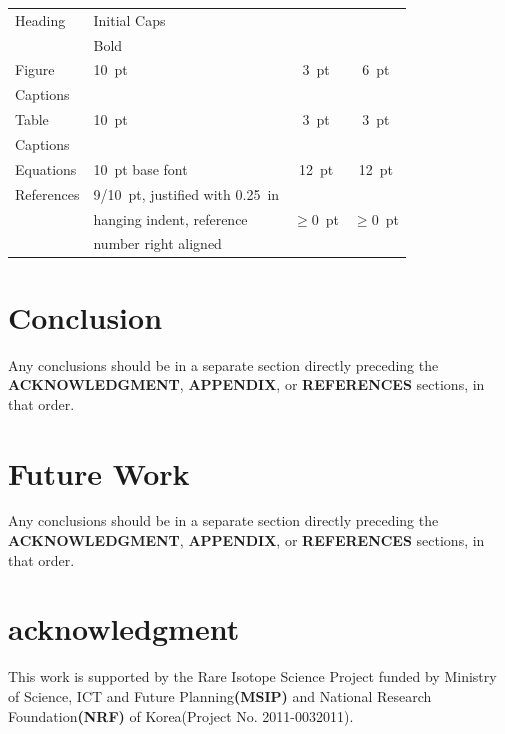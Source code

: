 \documentclass[a4paper,
              ]{jacow}
\newcommand\SEC[1]{\textbf{\uppercase{#1}}}
\begin{document}
\begin{table}[h!t]
\begin{tabular}{@{}llcc@{}}
         Heading       & Initial Caps                &                 &      \\
                       & Bold                        &                 &      \\
        \midrule
         Figure        & \SI{10}{pt}                 & \SI{3}{pt}           & \SI{6}{pt}  \\
         Captions      &                             &                 &      \\
        \midrule
         Table         & \SI{10}{pt}                      & \SI{3}{pt}           & \SI{3}{pt}  \\
         Captions      &                             &                 &      \\
        \midrule
         Equations     & \SI{10}{pt} base font            & \SI{12}{pt}          & \SI{12}{pt} \\
        \midrule
         References    & \SI{9/10}{pt}, justified with  \SI{0.25}{in} &      &  \\
                       & hanging indent, reference   & $\ge$\SI{0}{pt} & $\ge$\SI{0}{pt}  \\
                       & number right aligned     &                 &        \\
        \bottomrule
    \end{tabular}
\end{table}

\newpage
\section{Conclusion}
Any conclusions should be in a separate section directly preceding
the \SEC{Acknowledgment}, \SEC{Appendix}, or \SEC{References} sections, in that
order.

\section{Future Work}
Any conclusions should be in a separate section directly preceding
the \SEC{Acknowledgment}, \SEC{Appendix}, or \SEC{References} sections, in that
order.

\section{acknowledgment}
This work is supported by the Rare Isotope Science Project funded by Ministry of Science, ICT and Future Planning\SEC{(MSIP)} and National Research Foundation\SEC{(NRF)} of Korea(Project No. 2011-0032011).
\end{document}
